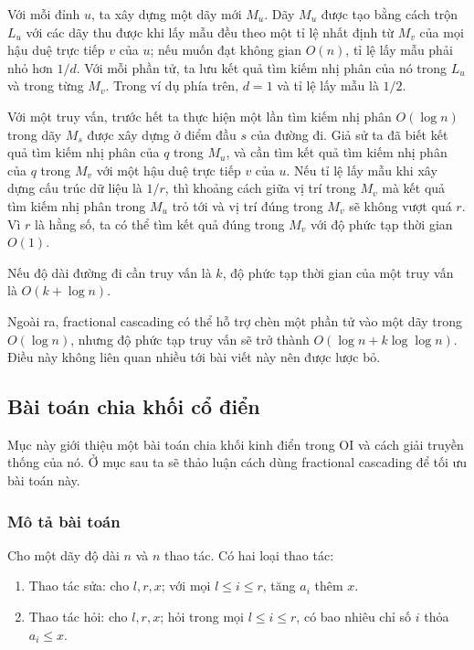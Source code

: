 \documentclass[11pt]{article}
\begin{document}
Với mỗi đỉnh $u$, ta xây dựng một dãy mới $M_u$. Dãy $M_u$ được tạo bằng cách
trộn $L_u$ với các dãy thu được khi lấy mẫu đều theo một tỉ lệ nhất định từ
$M_v$ của mọi hậu duệ trực tiếp $v$ của $u$; nếu muốn đạt không gian $O(n)$,
tỉ lệ lấy mẫu phải nhỏ hơn $1/d$. Với mỗi phần tử, ta lưu kết quả tìm kiếm nhị
phân của nó trong $L_u$ và trong từng $M_v$. Trong ví dụ phía trên, $d=1$ và tỉ
lệ lấy mẫu là $1/2$.

Với một truy vấn, trước hết ta thực hiện một lần tìm kiếm nhị phân $O(\log n)$
trong dãy $M_s$ được xây dựng ở điểm đầu $s$ của đường đi. Giả sử ta đã biết kết
quả tìm kiếm nhị phân của $q$ trong $M_u$, và cần tìm kết quả tìm kiếm nhị phân
của $q$ trong $M_v$ với một hậu duệ trực tiếp $v$ của $u$. Nếu tỉ lệ lấy mẫu
khi xây dựng cấu trúc dữ liệu là $1/r$, thì khoảng cách giữa vị trí trong $M_v$
mà kết quả tìm kiếm nhị phân trong $M_u$ trỏ tới và vị trí đúng trong $M_v$ sẽ
không vượt quá $r$. Vì $r$ là hằng số, ta có thể tìm kết quả đúng trong $M_v$
với độ phức tạp thời gian $O(1)$.

Nếu độ dài đường đi cần truy vấn là $k$, độ phức tạp thời gian của một truy vấn
là $O(k+\log n)$.

Ngoài ra, fractional cascading có thể hỗ trợ chèn một phần tử vào một dãy trong
$O(\log n)$, nhưng độ phức tạp truy vấn sẽ trở thành $O(\log n+k\log\log n)$.
Điều này không liên quan nhiều tới bài viết này nên được lược bỏ.

\subsection{Bài toán chia khối cổ điển}

Mục này giới thiệu một bài toán chia khối kinh điển trong OI và cách giải
truyền thống của nó. Ở mục sau ta sẽ thảo luận cách dùng fractional cascading
để tối ưu bài toán này.

\subsubsection{Mô tả bài toán}

Cho một dãy độ dài $n$ và $n$ thao tác. Có hai loại thao tác:

\begin{enumerate}
  \item Thao tác sửa: cho $l,r,x$; với mọi $l\le i\le r$, tăng $a_i$ thêm $x$.
  \item Thao tác hỏi: cho $l,r,x$; hỏi trong mọi $l\le i\le r$, có bao nhiêu
  chỉ số $i$ thỏa $a_i\le x$.
\end{enumerate}
\end{document}
